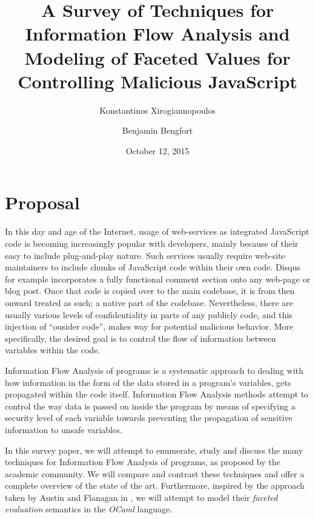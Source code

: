 \documentclass[11pt,letterpaper]{article}
\begin{document}
\title{A Survey of Techniques for Information Flow Analysis and Modeling of Faceted Values for Controlling Malicious JavaScript}
\author{Konstantinos Xirogiannopoulos}
\author{Benjamin Bengfort}

\date{October 12, 2015}

\maketitle
\section{Proposal}
In this day and age of the Internet, usage of web-services as integrated JavaScript code is becoming increasingly popular with developers, mainly because of their easy to include plug-and-play nature. Such services usually require web-site maintainers to include chunks of JavaScript code within their own code. Disqus~\cite{disqus} for example incorporates a fully functional comment section onto any web-page or blog post. Once that code is copied over to the main codebase, it is from then onward treated as such; a native part of the codebase. Nevertheless, there are usually various levels of confidentiality in parts of any publicly code, and this injection of ``ousider code'', makes way for potential malicious behavior. More specifically, the desired  goal is to control the flow of information between variables within the code.

Information Flow Analysis of programs is a systematic approach to dealing with how information in the form of the data stored in a program's variables, gets propagated within the code itself. Information Flow Analysis methods attempt to control the way data is passed on inside the program by means of specifying a security level of each variable towards preventing the propagation of sensitive information to unsafe variables.

In this survey paper, we will attempt to enumerate, study and discuss the many techniques for Information Flow Analysis of programs, as proposed by the academic community. We will compare and contrast these techniques and offer a complete overview of the state of the art. Furthermore, inspired by the approach taken by Austin and Flanagan in \cite{austin2012multiple}, we will attempt to model their \textit{faceted evaluation} semantics in the \textit{OCaml} language.
\\
\end{document}
